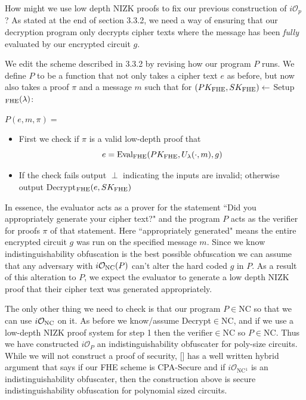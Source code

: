 \documentclass[12pt,twoside]{reedthesis}
\begin{document}
    \par How might we use low depth NIZK proofs to fix our previous construction of $i\mathcal{O}_p$? As stated at the end of section 3.3.2, we need a way of ensuring that our decryption program only decrypts cipher texts where the message has been \textit{fully} evaluated by our encrypted circuit $g$.
    \par We edit the scheme described in 3.3.2 by revising how our program $P$ runs. We define $P$ to be a function that not only takes a cipher text $e$ as before, but now also takes a proof $\pi$ and a message $m$ such that for $(PK_\text{FHE},SK_\text{FHE}) \leftarrow$ Setup$_\text{FHE}(\lambda)$:
    
   
   \par$P(e,m,\pi) =$
   \begin{itemize}
   \item First we check if $\pi$ is a valid low-depth proof that
   $$e =\text{Eval}_\text{FHE}(PK_\text{FHE},U_\lambda(\cdot,m),g) $$
   \item If the check fails output $\perp$ indicating the inputs are invalid; otherwise output Decrypt$_\text{FHE}(e,SK_\text{FHE})$
   \end{itemize}
    
    
    \par In essence, the evaluator acts as a prover for the statement ``Did you appropriately generate your cipher text?" and the program $P$ acts as the verifier for proofs $\pi$ of that statement. Here ``appropriately generated" means the entire encrypted circuit $g$ was run on the specified message $m$. Since we know indistinguishability obfuscation is the best possible obfuscation we can assume that any adversary with $i\mathcal{O}_\text{NC}(P)$ can't alter the hard coded $g$ in $P$. As a result of this alteration to $P$, we expect the evaluator to generate a low depth NIZK proof that their cipher text was generated appropriately.
    \par The only other thing we need to check is that our program $P\in$NC so that we can use $i\mathcal{O}_\text{NC}$ on it. As before we know/assume Decrypt$\in$NC, and if we use a low-depth NIZK proof system for step 1 then the verifier$\in$NC so $P\in$NC. Thus we have constructed $i\mathcal{O}_P$ an indistinguishability obfuscater for poly-size circuits. While we will not construct a proof of security, [\cite{Garg:2013}] has a well written hybrid argument that says if our FHE scheme is CPA-Secure and if $i\mathcal{O}_\text{NC$^1$}$  is an indistinguishability obfuscater, then the construction above is secure indistinguishability obfuscation for polynomial sized circuits.
    
\end{document}
